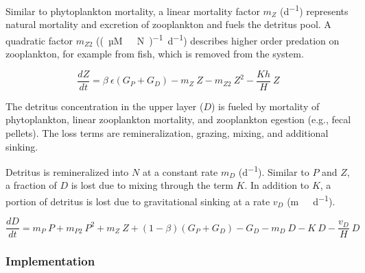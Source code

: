 \documentclass[journal abbreviation, manuscript]{copernicus}
\begin{document}
Similar to phytoplankton mortality, a linear mortality factor $m_Z$ (\unit{d^{-1}}) represents natural mortality and excretion of zooplankton and fuels the detritus pool. A quadratic factor $m_{Z2}$ (\unit{(µM \ N)^{-1} d^{−1}}) describes higher order predation on zooplankton, for example from fish, which is removed from the system. 

\begin{equation}
    \frac{d Z}{d t} =
    \beta \ \epsilon(G_P + G_D) %
    - m_Z \ Z %
    - m_{Z2} \ Z^2 %
    - \frac{K h}{H} \ Z %
\end{equation}


The detritus concentration in the upper layer ($D$) is fueled by mortality of phytoplankton, linear zooplankton mortality, and zooplankton egestion (e.g., fecal pellets). The loss terms are remineralization, grazing, mixing, and additional sinking. 

Detritus is remineralized into $N$ at a constant rate $m_D$ (\unit{d^{−1}}). Similar to $P$ and $Z$, a fraction of $D$ is lost due to mixing through the term $K$. In addition to $K$, a portion of detritus is lost due to gravitational sinking at a rate $v_D$ (\unit{m\ d^{−1}}). 

\begin{equation}
    \frac{d D}{d t} = 
    m_P \ P %
    + m_{P2} \ P^2 %
    + m_Z \ Z %
    + (1 - \beta)(G_P + G_D) %
    - G_D %
    - m_D \ D %
    - K \ D %
    - \frac{v_D}{H} \ D %
\end{equation}






\subsubsection{Implementation}
\label{Section:EMPOWERImplementation}
\end{document}
